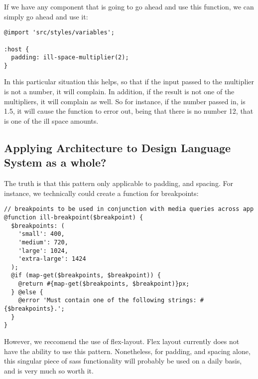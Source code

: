 If we have any component that is going to go ahead and use this function, we
can simply go ahead and use it:

\begin{lstlisting}
@import 'src/styles/variables';

:host {
  padding: ill-space-multiplier(2);
}
\end{lstlisting}

In this particular situation this helps, so that if the input passed to the
multiplier is not a number, it will complain. In addition, if the result is not
one of the multipliers, it will complain as well. So for instance, if the number
passed in, is 1.5, it will cause the function to error out, being that there is
no number 12, that is one of the ill space amounts.

\subsection{ Applying Architecture to Design Language System as a whole? }
The truth is that this pattern only applicable to padding, and spacing. For
instance, we technically could create a function for breakpoints:
\begin{lstlisting}
// breakpoints to be used in conjunction with media queries across app
@function ill-breakpoint($breakpoint) {
  $breakpoints: (
    'small': 400,
    'medium': 720,
    'large': 1024,
    'extra-large': 1424
  );
  @if (map-get($breakpoints, $breakpoint)) {
    @return #{map-get($breakpoints, $breakpoint)}px;
  } @else {
    @error 'Must contain one of the following strings: #{$breakpoints}.';
  }
}
\end{lstlisting}

However, we reccomend the use of flex-layout. Flex layout currently does not
have the ability to use this pattern. Nonetheless, for padding, and spacing
alone, this singular piece of sass functionality will probably be used on a
daily basis, and is very much so worth it. 

